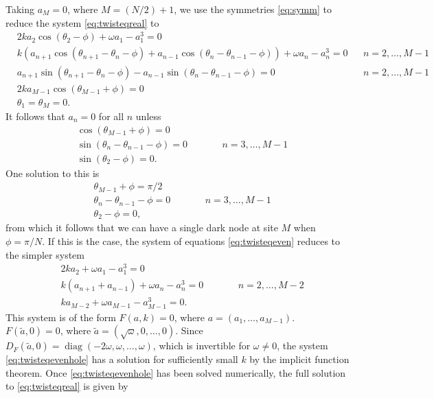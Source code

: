 \documentclass[12pt,reqno]{amsart}
\DeclareMathOperator{\diag}{diag}
\begin{document}
Taking $a_M = 0$, where $M = (N/2)+1$, we use the symmetries \cref{eq:symm} to reduce the system \cref{eq:twisteqreal} to
\begin{equation}\label{eq:twisteqeven}
\begin{aligned}
&2 k a_2 \cos(\theta_2 - \phi) + \omega a_1 - a_1^3 = 0 \\
&k( a_{n+1} \cos(\theta_{n+1}-\theta_n-\phi) + a_{n-1} \cos(\theta_n - \theta_{n-1}-\phi)) + \omega a_n - a_n^3 = 0 && n = 2, \dots, M-1 \\
&a_{n+1} \sin(\theta_{n+1}-\theta_n-\phi) - a_{n-1} \sin(\theta_n - \theta_{n-1}-\phi) = 0 && n = 2, \dots, M-1 \\
&2 k a_{M-1} \cos(\theta_{M-1} + \phi) = 0 \\
& \theta_1 = \theta_M = 0.
\end{aligned}
\end{equation}
It follows that $a_n = 0$ for all $n$ unless
\begin{equation}\label{eq:evendarknodecond}
\begin{aligned}
&\cos(\theta_{M-1} + \phi) = 0 \\
&\sin(\theta_{n} - \theta_{n-1} - \phi) = 0 && \qquad n = 3, \dots, M-1 \\
&\sin(\theta_2 - \phi) = 0.
\end{aligned}
\end{equation}
One solution to this is
\begin{equation}\label{eq:evendarknodecond1}
\begin{aligned}
&\theta_{M-1} + \phi = \pi/2 \\
&\theta_{n} - \theta_{n-1} - \phi = 0 && \qquad n = 3, \dots, M-1 \\
&\theta_2 - \phi = 0,
\end{aligned}
\end{equation}
from which it follows that we can have a single dark node at site $M$ when $\phi = \pi/N$. If this is the case, the system of equations \cref{eq:twisteqeven} reduces to the simpler system 
\begin{equation}\label{eq:twisteqevenhole}
\begin{aligned}
&2 k a_2 + \omega a_1 - a_1^3 = 0 \\
&k\left( a_{n+1} + a_{n-1} \right) + \omega a_n - a_n^3 = 0 && \qquad n = 2, \dots, M-2 \\
&k a_{M-2} + \omega a_{M-1} - a_{M-1}^3 = 0.
\end{aligned}
\end{equation}
This system is of the form $F(a,k) = 0$, where $a = (a_1, \dots, a_{M-1})$. $F(\tilde{a}, 0) = 0$, where $\tilde{a} = (\sqrt{\omega}, 0, \dots, 0)$. Since $D_F(\tilde{a}, 0) = \diag(-2\omega,\omega, \dots, \omega)$, which is invertible for $\omega \neq 0$, the system \cref{eq:twisteqevenhole} has a solution for sufficiently small $k$ by the implicit function theorem. Once \cref{eq:twisteqevenhole} has been solved numerically, the full solution to \cref{eq:twisteqreal} is given by
\end{document}
